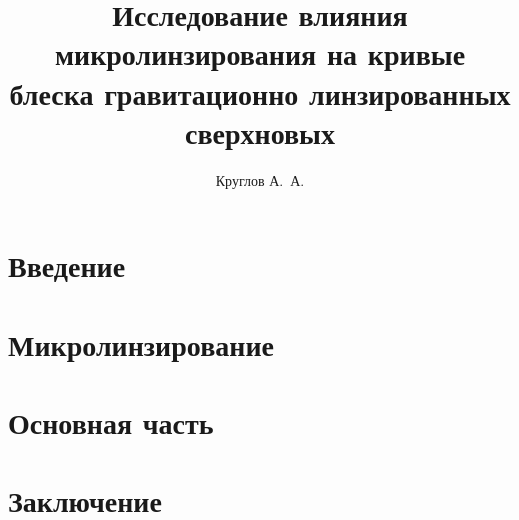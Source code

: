 \documentclass{mipt-thesis-bs}
\title{Исследование влияния микролинзирования на кривые
           блеска гравитационно линзированных сверхновых}
\author{Круглов А.\ А.}
\numberwithin{equation}{chapter}
\begin{document}
    

    \frontmatter
    \titlecontents \setcounter{page}{3}
    
    
    
    \mainmatter


\chapter{Введение} \setcounter{page}{5}
    

\chapter{Микролинзирование}
    
    
\chapter{Основная часть}
    

\chapter{Заключение}
    

    \backmatter

    \printbib
    
    
\end{document}
